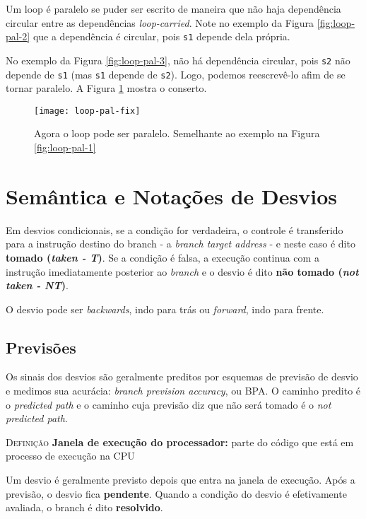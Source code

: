 Um loop é paralelo se puder ser escrito de maneira que não haja dependência circular entre as dependências \textit{loop-carried}. Note no exemplo da Figura \ref{fig:loop-pal-2} que a dependência é circular, pois \texttt{s1} depende dela própria.

No exemplo da Figura \ref{fig:loop-pal-3}, não há dependência circular, pois \texttt{s2} não depende de \texttt{s1} (mas \texttt{s1} depende de \texttt{s2}). Logo, podemos reescrevê-lo afim de se tornar paralelo. A Figura \ref{fig:loop-pal-fix} mostra o conserto.

\begin{figure}[ht]
  \centering
  \texttt{[image: loop-pal-fix]}
  \caption{Agora o loop pode ser paralelo. Semelhante ao exemplo na Figura \ref{fig:loop-pal-1}}
  \label{fig:loop-pal-fix}
\end{figure}






\section{Semântica e Notações de Desvios}
Em desvios condicionais, se a condição for verdadeira, o controle é transferido para a instrução destino do branch - a \textit{branch target address} - e neste caso é dito \textbf{tomado (\textit{taken - T})}. Se a condição é falsa, a execução continua com a instrução imediatamente posterior ao \textit{branch} e o desvio é dito \textbf{não tomado (\textit{not taken - NT})}.

O desvio pode ser \textit{backwards}, indo para trás ou \textit{forward}, indo para frente.



\subsection{Previsões}
Os sinais dos desvios são geralmente preditos por esquemas de previsão de desvio e medimos sua acurácia: \textit{branch prevision accuracy}, ou BPA. O caminho predito é o \textit{predicted path} e o caminho cuja previsão diz que não será tomado é o \textit{not predicted path}.

\textsc{Definição} \textbf{Janela de execução do processador:} parte do código que está em processo de execução na CPU

Um desvio é geralmente previsto depois que entra na janela de execução. Após a previsão, o desvio fica \textbf{pendente}. Quando a condição do desvio é efetivamente avaliada, o branch é dito \textbf{resolvido}.

